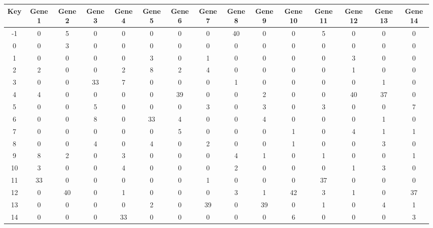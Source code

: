 \begin{tabular}{|c|c|c|c|c|c|c|c|c|c|c|c|c|c|c|}
\hline
Key & Gene 1 & Gene 2 & Gene 3 & Gene 4 & Gene 5 & Gene 6 & Gene 7 & Gene 8 & Gene 9 & Gene 10 & Gene 11 & Gene 12 & Gene 13 & Gene 14 \\
\hline
-1 & 0 & 5 & 0 & 0 & 0 & 0 & 0 & 40 & 0 & 0 & 5 & 0 & 0 & 0 \\
0 & 0 & 3 & 0 & 0 & 0 & 0 & 0 & 0 & 0 & 0 & 0 & 0 & 0 & 0 \\
1 & 0 & 0 & 0 & 0 & 3 & 0 & 1 & 0 & 0 & 0 & 0 & 3 & 0 & 0 \\
2 & 2 & 0 & 0 & 2 & 8 & 2 & 4 & 0 & 0 & 0 & 0 & 1 & 0 & 0 \\
3 & 0 & 0 & 33 & 7 & 0 & 0 & 0 & 1 & 0 & 0 & 0 & 0 & 1 & 0 \\
4 & 4 & 0 & 0 & 0 & 0 & 39 & 0 & 0 & 2 & 0 & 0 & 40 & 37 & 0 \\
5 & 0 & 0 & 5 & 0 & 0 & 0 & 3 & 0 & 3 & 0 & 3 & 0 & 0 & 7 \\
6 & 0 & 0 & 8 & 0 & 33 & 4 & 0 & 0 & 4 & 0 & 0 & 0 & 1 & 0 \\
7 & 0 & 0 & 0 & 0 & 0 & 5 & 0 & 0 & 0 & 1 & 0 & 4 & 1 & 1 \\
8 & 0 & 0 & 4 & 0 & 4 & 0 & 2 & 0 & 0 & 1 & 0 & 0 & 3 & 0 \\
9 & 8 & 2 & 0 & 3 & 0 & 0 & 0 & 4 & 1 & 0 & 1 & 0 & 0 & 1 \\
10 & 3 & 0 & 0 & 4 & 0 & 0 & 0 & 2 & 0 & 0 & 0 & 1 & 3 & 0 \\
11 & 33 & 0 & 0 & 0 & 0 & 0 & 1 & 0 & 0 & 0 & 37 & 0 & 0 & 0 \\
12 & 0 & 40 & 0 & 1 & 0 & 0 & 0 & 3 & 1 & 42 & 3 & 1 & 0 & 37 \\
13 & 0 & 0 & 0 & 0 & 2 & 0 & 39 & 0 & 39 & 0 & 1 & 0 & 4 & 1 \\
14 & 0 & 0 & 0 & 33 & 0 & 0 & 0 & 0 & 0 & 6 & 0 & 0 & 0 & 3 \\
\hline
\end{tabular}